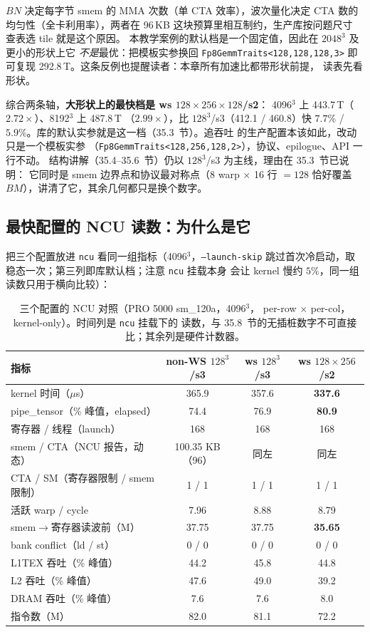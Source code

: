 $BN$ 决定每字节 smem 的 MMA 次数（单 CTA 效率），波次量化决定 CTA 数的
均匀性（全卡利用率），两者在 96\,KB 这块预算里相互制约，生产库按问题尺寸
查表选 tile 就是这个原因。
本教学案例的默认档是一个固定值，因此在 $2048^3$ 及更小的形状上它
\emph{不是}最优：把模板实参换回 \texttt{Fp8GemmTraits<128,128,128,3>}
即可复现 292.8\,T。这条反例也提醒读者：本章所有加速比都带形状前提，
读表先看形状。

综合两条轴，\textbf{大形状上的最快档是 ws $128\times256\times128$/s2}：
4096$^3$ 上 443.7\,T（$2.72\times$）、8192$^3$ 上 487.8\,T
（$2.99\times$），比 $128^3$/s3（412.1 / 460.8）快
$7.7\%$ / $5.9\%$。库的默认实参就是这一档（35.3~节）。追吞吐
的生产配置本该如此，改动只是一个模板实参
（\texttt{Fp8GemmTraits<128,256,128,2>}），协议、epilogue、API 一行不动。
结构讲解（35.4--35.6~节）仍以 $128^3$/s3 为主线，理由在 35.3~节已说明：
它同时是 smem 边界点和协议最对称点（8 warp $\times$ 16 行 $=128$
恰好覆盖 $BM$），讲清了它，其余几何都只是换个数字。

\subsection{最快配置的 NCU 读数：为什么是它}\label{sec:35-ncu}

把三个配置放进 \texttt{ncu} 看同一组指标（4096$^3$，\texttt{--launch-skip}
跳过首次冷启动，取稳态一次；第三列即库默认档；注意 \texttt{ncu} 挂载本身
会让 kernel 慢约
$5\%$，同一组读数只用于横向比较）：

\begin{table}[H]
\centering
\scriptsize
\begin{tabular}{lccc}
\toprule
指标 & non-WS $128^3$/s3 & ws $128^3$/s3 & ws $128\times256$/s2 \\
\midrule
kernel 时间（$\mu$s）            & 365.9 & 357.6 & \textbf{337.6} \\
pipe\_tensor（\% 峰值，elapsed） & 74.4  & 76.9  & \textbf{80.9} \\
寄存器 / 线程（launch）          & 168   & 168   & 168 \\
smem / CTA（NCU 报告，动态）    & 100.35 KB（96）& 同左 & 同左 \\
CTA / SM（寄存器限制 / smem 限制）& 1 / 1 & 1 / 1 & 1 / 1 \\
活跃 warp / cycle                & 7.96  & 8.88  & 8.79 \\
smem$\to$寄存器读波前（M）       & 37.75 & 37.75 & \textbf{35.65} \\
bank conflict（ld / st）         & 0 / 0 & 0 / 0 & 0 / 0 \\
L1TEX 吞吐（\% 峰值）            & 44.2  & 45.8  & 44.8 \\
L2 吞吐（\% 峰值）               & 47.6  & 49.0  & 39.2 \\
DRAM 吞吐（\% 峰值）             & 7.6   & 7.6   & 8.0 \\
指令数（M）                      & 82.0  & 81.1  & 72.2 \\
\bottomrule
\end{tabular}
\caption{三个配置的 NCU 对照（PRO 5000 sm\_120a，4096$^3$，
per-row $\times$ per-col，kernel-only）。时间列是 \texttt{ncu} 挂载下的
读数，与 35.8~节的无插桩数字不可直接比；其余列是硬件计数器。}
\label{tab:35-ncu}
\end{table}

